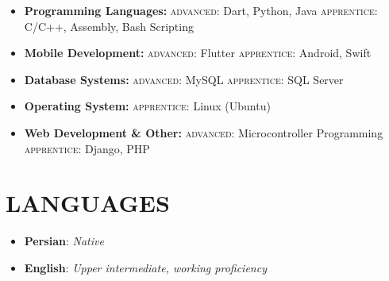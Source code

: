 \documentclass[margin]{res}
\begin{document}
\begin{resume}
\begin{itemize} \itemsep -8pt

\item \textbf{Programming Languages:}
\subitem \textsc{advanced:}
Dart, Python, Java
\subitem \textsc{apprentice:}
C/C++, Assembly, Bash Scripting\\

\item \textbf{Mobile Development:}
\subitem \textsc{advanced:}
Flutter
\subitem \textsc{apprentice:}
Android, Swift\\

\item \textbf{Database Systems:}
\subitem \textsc{advanced:}
MySQL
\subitem \textsc{apprentice:}
SQL Server\\

\item \textbf{Operating System:}
\subitem \textsc{apprentice:}
Linux (Ubuntu)\\

\item \textbf{Web Development \& Other:}
\subitem \textsc{advanced:}
Microcontroller Programming
\subitem \textsc{apprentice:}
Django, PHP\\
	
\end{itemize}



\section{LANGUAGES}

\begin{itemize} \itemsep +3pt

\item \textbf{Persian}: \textit{Native}
\item \textbf{English}: \textit{Upper intermediate, working proficiency}

\end{itemize} 



\end{resume}
\end{document}
